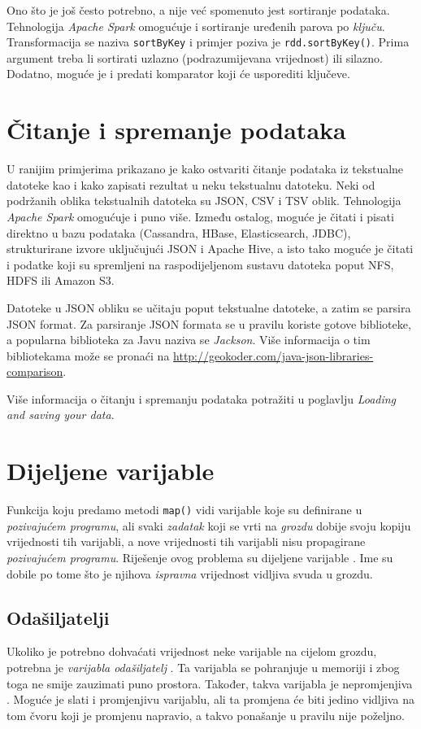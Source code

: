 \documentclass[times, utf8, zavrsni, numeric]{fer}
\begin{document}
Ono što je još često potrebno, a nije već spomenuto jest sortiranje podataka. Tehnologija \emph{Apache Spark} omogućuje i sortiranje uređenih parova po \emph{ključu}. Transformacija se naziva \texttt{sortByKey} i primjer poziva je \texttt{rdd.sortByKey()}. Prima argument treba li sortirati uzlazno (podrazumijevana vrijednost) ili silazno. Dodatno, moguće je i predati komparator koji će usporediti ključeve. 

\section{Čitanje i spremanje podataka }
U ranijim primjerima prikazano je kako ostvariti čitanje podataka iz tekstualne datoteke kao i kako zapisati rezultat u neku tekstualnu datoteku. Neki od podržanih oblika tekstualnih datoteka su JSON, CSV i TSV oblik. Tehnologija \emph{Apache Spark} omogućuje i puno više. Između ostalog, moguće je čitati i pisati direktno u bazu podataka (Cassandra, HBase, Elasticsearch, JDBC), strukturirane izvore uključujući JSON i Apache Hive, a isto tako moguće je čitati i podatke koji su spremljeni na raspodijeljenom sustavu datoteka poput NFS, HDFS ili Amazon S3.

Datoteke u JSON obliku se učitaju poput tekstualne datoteke, a zatim se parsira JSON format. Za parsiranje JSON formata se u pravilu koriste gotove biblioteke, a popularna biblioteka za Javu naziva se \emph{Jackson}. Više informacija o tim bibliotekama može se pronaći na \url{http://geokoder.com/java-json-libraries-comparison}. 

Više informacija o čitanju i spremanju podataka potražiti u poglavlju \emph{Loading and saving your data}\cite{learningSpark}.

\section{Dijeljene varijable}
Funkcija koju predamo metodi \texttt{map()} vidi varijable koje su definirane u \emph{pozivajućem programu}, ali svaki \emph{zadatak}  koji se vrti na \emph{grozdu} dobije svoju kopiju vrijednosti tih varijabli, a nove vrijednosti tih varijabli nisu propagirane \emph{pozivajućem programu}. Riješenje ovog problema su dijeljene varijable . Ime su dobile po tome što je njihova \emph{ispravna} vrijednost vidljiva svuda u grozdu.

\subsection{Odašiljatelji}
Ukoliko je potrebno dohvaćati vrijednost neke varijable na cijelom grozdu, potrebna je \emph{varijabla odašiljatelj} . Ta varijabla se pohranjuje u memoriji i zbog toga ne smije zauzimati puno prostora. Također, takva varijabla je nepromjenjiva . Moguće je slati i promjenjivu varijablu, ali ta promjena će biti jedino vidljiva na tom čvoru koji je promjenu napravio, a takvo ponašanje u pravilu nije poželjno. 
\end{document}
